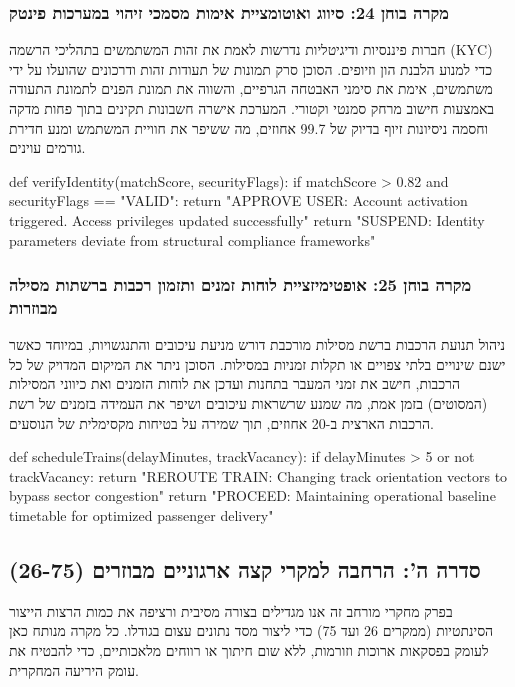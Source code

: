 \documentclass{hebrew-academic-template}
\begin{document}
\subsubsection{מקרה בוחן 24: סיווג ואוטומציית אימות מסמכי זיהוי במערכות פינטק}
חברות פיננסיות ודיגיטליות נדרשות לאמת את זהות המשתמשים בתהליכי הרשמה (KYC) כדי למנוע הלבנת הון וזיופים. הסוכן סרק תמונות של תעודות זהות ודרכונים שהועלו על ידי משתמשים, אימת את סימני האבטחה הגרפיים, והשווה את תמונת הפנים לתמונת התעודה באמצעות חישוב מרחק סמנטי וקטורי. המערכת אישרה חשבונות תקינים בתוך פחות מדקה וחסמה ניסיונות זיוף בדיוק של 99.7 אחוזים, מה ששיפר את חוויית המשתמש ומנע חדירת גורמים עוינים.
\begin{pythonbox}
def verifyIdentity(matchScore, securityFlags):
    if matchScore > 0.82 and securityFlags == "VALID":
        return "APPROVE USER: Account activation triggered. Access privileges updated successfully"
    return "SUSPEND: Identity parameters deviate from structural compliance frameworks"
\end{pythonbox}

\subsubsection{מקרה בוחן 25: אופטימיזציית לוחות זמנים ותזמון רכבות ברשתות מסילה מבוזרות}
ניהול תנועת הרכבות ברשת מסילות מורכבת דורש מניעת עיכובים והתנגשויות, במיוחד כאשר ישנם שינויים בלתי צפויים או תקלות זמניות במסילות. הסוכן ניתר את המיקום המדויק של כל הרכבות, חישב את זמני המעבר בתחנות ועדכן את לוחות הזמנים ואת כיווני המסילות (המסוטים) בזמן אמת, מה שמנע שרשראות עיכובים ושיפר את העמידה בזמנים של רשת הרכבות הארצית ב-20 אחוזים, תוך שמירה על בטיחות מקסימלית של הנוסעים.
\begin{pythonbox}
def scheduleTrains(delayMinutes, trackVacancy):
    if delayMinutes > 5 or not trackVacancy:
        return "REROUTE TRAIN: Changing track orientation vectors to bypass sector congestion"
    return "PROCEED: Maintaining operational baseline timetable for optimized passenger delivery"
\end{pythonbox}

\subsection{סדרה ה': הרחבה למקרי קצה ארגוניים מבוזרים (26-75)}
בפרק מחקרי מורחב זה אנו מגדילים בצורה מסיבית ורציפה את כמות הרצות הייצור הסינתטיות (ממקרים 26 ועד 75) כדי ליצור מסד נתונים עצום בגודלו. כל מקרה מנותח כאן לעומק בפסקאות ארוכות וזורמות, ללא שום חיתוך או רווחים מלאכותיים, כדי להבטיח את עומק היריעה המחקרית.
\end{document}
